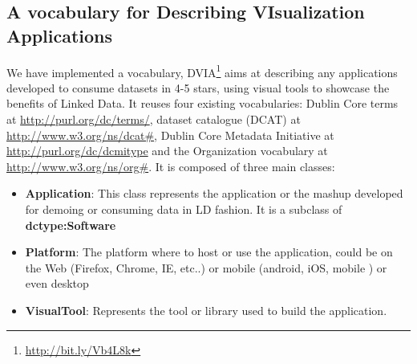  \subsection{A vocabulary for Describing VIsualization Applications} \label{sec:dvia}

We have implemented a vocabulary, DVIA\footnote{\url{http://bit.ly/Vb4L8k}} aims at describing any applications developed to consume datasets in 4-5 stars, using visual tools to showcase the benefits of Linked Data. It reuses four existing vocabularies: Dublin Core terms at \url{http://purl.org/dc/terms/}, dataset catalogue (DCAT) at \url{http://www.w3.org/ns/dcat#}, Dublin Core Metadata Initiative at \url{http://purl.org/dc/dcmitype} and the Organization vocabulary at \url{http://www.w3.org/ns/org#}.  It is composed of three main classes:

\begin{itemize}
\item \textbf{Application}: This class represents the application or the mashup developed for demoing or consuming data in LD fashion. It is a subclass of \textbf{dctype:Software}
\item \textbf{Platform}: The platform where to host or use the application, could be on the Web (Firefox, Chrome, IE, etc..) or mobile (android, iOS, mobile ) or even desktop
\item \textbf{VisualTool}: Represents the tool or library used to build the application.
\end{itemize}

\begin{figure}[!htbp]
\vspace{-2.5cm}
\end{figure}

